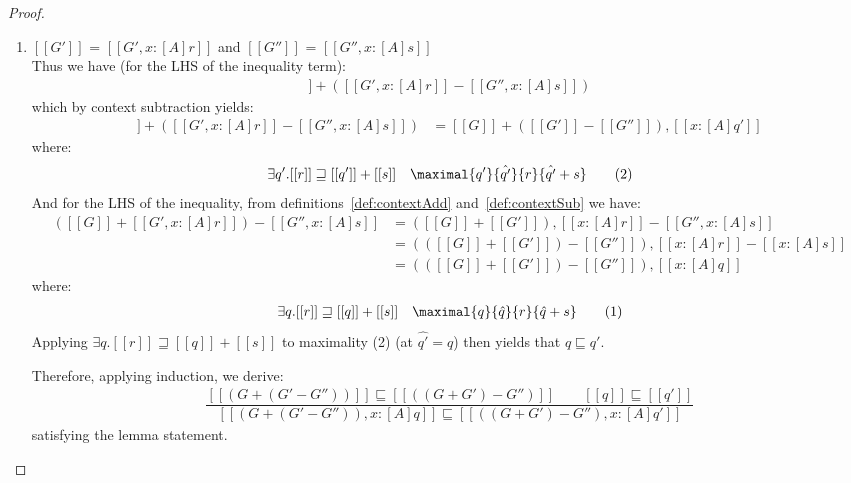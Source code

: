 \begin{proof}
\begin{enumerate}
    \item $[[G']]$ = $[[ G', x : [A] r ]]$ and $[[G'']]$ = $[[G'', x :
      [A] s]]$\\

      Thus we have (for the LHS of the inequality term):
       \begin{align*}
        [[G]] + ([[G', x : [A] r]] - [[G'', x : [A] s]])
      \end{align*}
    which by context subtraction yields:
      \begin{align*}
       [[G]] + ([[G', x :[A] r]] - [[G'', x : [A] s]]) &= [[G]] + ([[G']] -
                                                         [[G'']]), [[x : [A] q']]
      \end{align*}
      where:
      \begin{align*}
        \exists q' . [[r]] \sqsupseteq [[q']] + [[s]]
\quad \maximal{q'}{\hat{q'}}{r}{\hat{q'}+s} \qquad (2)
      \end{align*}
       And for the LHS of the inequality, from
       definitions~\ref{def:contextAdd} and~\ref{def:contextSub}
       we have:
      \begin{align*}
        ([[G]] + [[G', x : [A] r]]) - [[G'', x : [A] s]] &
= ([[G]] + [[G']]), [[x : [A] r]] - [[G'', x  : [A] s]] \\
  &= (([[G]] + [[G']]) -  [[G'']]), [[ x : [A]  r ]] - [[ x : [A]  s ]] \\
  &= (([[G]] + [[G']]) -  [[G'']]), [[x : [A] q]]
      \end{align*}
      where:
      \begin{align*}
        \exists q . [[r]] \sqsupseteq [[q]] + [[s]]
\quad \maximal{q}{\hat{q}}{r}{\hat{q}+s} \qquad (1)
      \end{align*}
    Applying $\exists q . [[r]] \sqsupseteq [[q]] + [[s]]$ to
    maximality (2) (at $\hat{q'} = q$) then yields that $q \sqsubseteq q'$.

    Therefore, applying induction, we derive:
     \begin{align*}
      \dfrac{[[(G + (G' - G''))]] \sqsubseteq [[((G + G') - G'') ]] \qquad [[ q ]] \sqsubseteq [[ q' ]]}
             {[[ {(G + (G' - G'')), x : [A] q}]] \sqsubseteq [[{((G + G') - G''), x : [A] q'} ]]}
     \end{align*}
    satisfying the lemma statement.

  \end{enumerate}
\end{proof}

